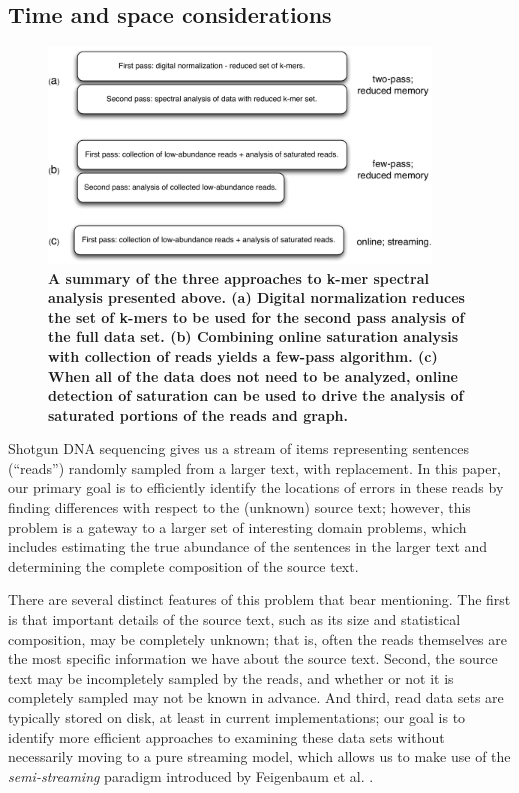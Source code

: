 \documentclass{article}
\begin{document}
\subsection{Time and space considerations}

\begin{figure}[!ht]
 \centerline{\includegraphics[width=4in]{./figures/summary-algorithms}}
\caption{\bf A summary of the three approaches to k-mer spectral analysis
  presented above.  (a) Digital normalization reduces the set of k-mers
  to be used for the second pass analysis of the full data set. (b) Combining
  online saturation analysis with collection of reads yields a few-pass
  algorithm.  (c) When all of the data does not need to be analyzed, online
  detection of saturation can be used to drive the analysis of saturated
  portions of the reads and graph.}
\label{fig:summary}
\end{figure}

\label{sec:alg}

Shotgun DNA sequencing gives us a stream
of items representing sentences (``reads'') randomly sampled from a
larger text, with replacement.  In this paper, our primary goal is to
efficiently identify the locations of errors in these reads by
finding differences with respect to the (unknown) source text; however, this
problem is a gateway to a larger set of interesting domain problems,
which includes estimating the true abundance of the sentences in the
larger text and determining the complete composition of the source text.

There are several distinct features of this problem that bear
mentioning.  The first is that important details of the source text,
such as its size and statistical composition, may be completely
unknown; that is, often the reads themselves are the most specific
information we have about the source text.  Second, the source text
may be incompletely sampled by the reads, and whether or not it is
completely sampled may not be known in advance.  And third, read
data sets are typically stored on disk, at least in current
implementations; our goal is to identify more efficient approaches to
examining these data sets without necessarily moving to a pure
streaming model, which allows us to make use of the {\em
  semi-streaming} paradigm introduced by Feigenbaum et
al. \cite{Feigenbaum2005}.
\end{document}

